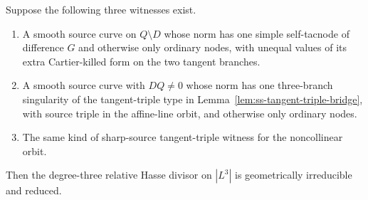 \begin{proposition}
\label{prop:ss-level3-three-witness-reduction}
Suppose the following three witnesses exist.
\begin{enumerate}
\item A smooth source curve on $Q\setminus D$ whose norm has one
simple self-tacnode of difference $G$ and otherwise only ordinary
nodes, with unequal values of its extra Cartier-killed form on
the two tangent branches.
\item A smooth source curve with $D Q\ne0$ whose norm has one
three-branch singularity of the tangent-triple type in
Lemma~\ref{lem:ss-tangent-triple-bridge}, with source
triple in the affine-line orbit, and otherwise only ordinary nodes.
\item The same kind of sharp-source tangent-triple witness for the
noncollinear orbit.
\end{enumerate}
Then the degree-three relative Hasse divisor on $|L^3|$ is
geometrically irreducible and reduced.
\end{proposition}
